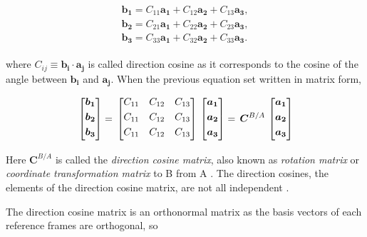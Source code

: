\begin{align}
\label{eqn:C_B_A}
\begin{split}
\bm{b_1} = C_{11}\bm{a_1} + C_{12}\bm{a_2} + C_{13}\bm{a_3}  ,
\\
\bm{b_2} = C_{21}\bm{a_1} + C_{22}\bm{a_2} + C_{23}\bm{a_3}  ,
\\
\bm{b_3} = C_{33}\bm{a_1} + C_{32}\bm{a_2} + C_{33}\bm{a_3}  .
\end{split}
\end{align}

where $C_{ij} \equiv {\bm{b_i} \cdot \bm{a_j}} $  is called direction cosine as it corresponds to the cosine of the angle between  $\bm{b_i}$ and $\bm{a_j}$. 
When the previous equation set written in matrix form,

\begin{equation}{\label{eqn:C_B_Amatrix}}
\begin{bmatrix}
\bm{b_1}\\[0.3em]
\bm{b_2}\\[0.3em]
\bm{b_3}\\[0.3em]
\end{bmatrix}
=\,
\begin{bmatrix}
C_{11} & C_{12} & C_{13}\\[0.3em]
C_{11} & C_{12} & C_{13}\\[0.3em]
C_{11} & C_{12} & C_{13}\\[0.3em]
\end{bmatrix}
\,
\begin{bmatrix}
\bm{a_1}\\[0.3em]
\bm{a_2}\\[0.3em]
\bm{a_3}\\[0.3em]
\end{bmatrix}
=\,
\bm{C}^{B/A}
\,
\begin{bmatrix}
\bm{a_1}\\[0.3em]
\bm{a_2}\\[0.3em]
\bm{a_3}\\[0.3em]
\end{bmatrix}
\end{equation} 

Here $\bm{C}^{B/A}$ is called the \emph{direction cosine matrix}, also known as \emph{rotation matrix} or \emph{coordinate transformation matrix} to B from A \cite{wie2008space}.  
The direction cosines, the elements of the direction cosine matrix, are not all independent  \cite{wertz1978spacecraftAttitude}.

The direction cosine matrix is an orthonormal matrix as the basis vectors of each reference frames are orthogonal, so

